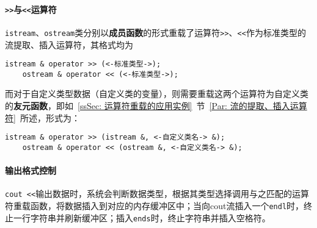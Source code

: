 \documentclass[10pt, a4paper, oneside, fontset=none]{ctexart}
\theoremstyle{plain}
\theoremstyle{definition}
\begin{document}
\paragraph{\texttt{>>}与\texttt{<<}运算符}

\texttt{istream}、\texttt{ostream}类分别以\textbf{成员函数}的形式重载了运算符\texttt{>>}、\texttt{<<}作为标准类型的流提取、插入运算符，其格式均为
\begin{lstlisting}[style=intro]
	istream & operator >> (<-标准类型->);
	ostream & operator << (<-标准类型->);
\end{lstlisting}
而对于自定义类型数据（自定义类的变量），则需要重载这两个运算符为自定义类的\textbf{友元函数}，即如~\ref{ssSec: 运算符重载的应用实例}~节~\ref{Par: 流的提取、插入运算符}~所述，形式为：
\begin{lstlisting}[style=intro]
	istream & operator >> (istream &, <-自定义类名-> &);
	ostream & operator << (ostream &, <-自定义类名-> &);
\end{lstlisting}


\paragraph{输出格式控制}

\texttt{cout <<}输出数据时，系统会判断数据类型，根据其类型选择调用与之匹配的运算符重载函数，将数据插入到对应的内存缓冲区中；当向cout流插入一个\texttt{endl}时，终止一行字符串并刷新缓冲区；插入\texttt{ends}时，终止字符串并插入空格符。
\end{document}
